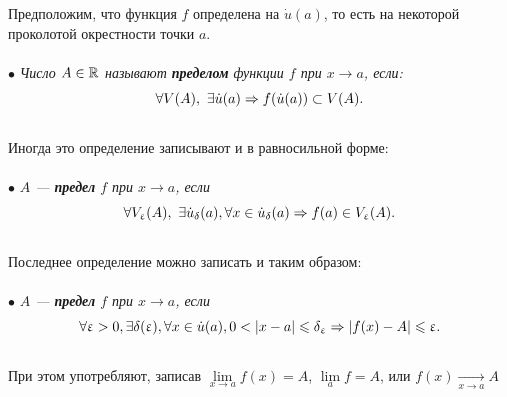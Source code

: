 Предположим, что функция $f$ определена на $\dot{u}(a)$, то есть на некоторой проколотой окрестности точки $a$.\\\\
$\bullet$ \textit{Число $A\in\mathbb{R}$ называют \textbf{пределом} функции $f$ при $x\rightarrow a$, если:}
$$\forall V(A),\ \exists \dot{u}(a)\Rightarrow f(\dot{u}(a))\subset V(A).$$\\
Иногда это определение записывают и в равносильной форме:\\\\
$\bullet$ \textit{$A$ --- \textbf{предел} $f$ при $x\rightarrow a$, если}
$$\forall V_{\varepsilon}(A),\ \exists\dot{u}_{\delta}(a),\forall x\in\dot{u}_{\delta}(a)\Ra f(a)\in V_{\varepsilon}(A).$$\\
Последнее определение можно записать и таким образом:\\\\
$\bullet$ \textit{$A$ --- \textbf{предел} $f$ при $x\rightarrow a$, если}
$$\forall\varepsilon>0,\exists\delta(\varepsilon),\forall x\in\dot{u}(a),0<|x-a|\leqslant\delta_\varepsilon\Ra|f(x)-A|\leqslant\varepsilon.$$\\
При этом употребляют, записав $\lim\limits_{x\to a}f(x) = A$, $\lim\limits_{a}f = A$, или $f(x)\underset{x\to a}{\longrightarrow}A$
